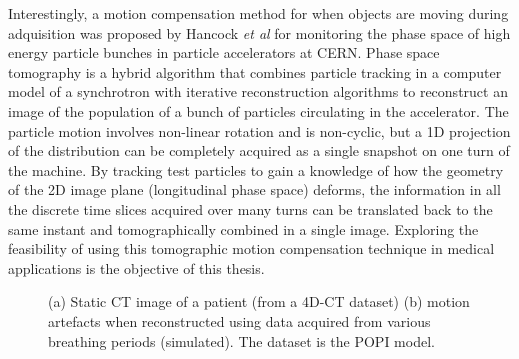 Interestingly, a motion compensation method for when objects are moving during adquisition was proposed by Hancock \textit{et al}\cite{pst1}\cite{pst2}\cite{pstweb} for monitoring the phase space of high energy particle bunches in particle accelerators at CERN. Phase space tomography is a hybrid algorithm that combines particle tracking in a computer model of a synchrotron with iterative reconstruction algorithms to reconstruct an image of the population of a bunch of particles circulating in the accelerator. The particle motion involves non-linear rotation and is non-cyclic, but a 1D projection of the distribution can be completely acquired as a single snapshot on one turn of the machine. By tracking test particles to gain a knowledge of how the geometry of the 2D image plane (longitudinal phase space) deforms, the information in all the discrete time slices acquired over many turns can be translated back to the same instant and tomographically combined in a single image.  Exploring the feasibility of using this tomographic motion compensation technique in medical applications is the objective of this thesis.

\begin{figure}

\begin{center} 
 
\caption[Motion blurr in lung CBCT]{\label{fig:motionblurr}(a) Static CT image of a patient (from a 4D-CT dataset) (b) motion artefacts when reconstructed using data acquired from various breathing periods (simulated). The dataset is the POPI model\cite{popi-modelweb}.}
\end{center} 
\end{figure}



